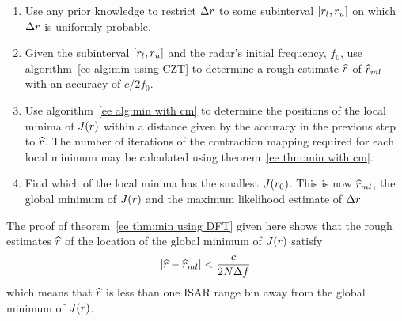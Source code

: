 \begin{enumerate}
\item Use any prior knowledge to restrict ${\Delta r}$ to some subinterval
$[{r}_l,{r}_u]$ on which ${\Delta r}$ is uniformly probable.

\item Given the subinterval $[{r}_l,{r}_u]$ and the radar's initial frequency, 
$f_0$, use algorithm~\ref{ee alg:min using CZT} to determine a rough estimate
$\widehat{r}$ of $\widehat{r}_{ml}$ with an accuracy of $c/2f_0$.

\item Use algorithm~\ref{ee alg:min with cm} to determine the positions of the 
local minima of $J({r})$ within a distance given by the accuracy in the 
previous step to $\widehat{r}$.  The number of iterations of the contraction
mapping required for each local minimum may be calculated using
theorem~\ref{ee thm:min with cm}.

\item Find which of the local minima has the smallest $J({r}_0)$.  This is
now $\widehat{r}_{ml}$, the global minimum of $J({r})$ and the maximum likelihood
estimate of ${\Delta r}$
\end{enumerate}

\label{ee app:min using DFT}

The proof of theorem~\ref{ee thm:min using DFT} given here shows that the
rough estimates $\widehat{r}$ of the location of the global minimum of $J({r})$
satisfy
\begin{equation}
\left|\widehat{r}-\widehat{r}_{ml}\right|<\frac{c}{2N\Delta f}
\end{equation}
which means that $\widehat{r}$ is less than one ISAR range bin away
from the global minimum of $J({r})$.  

